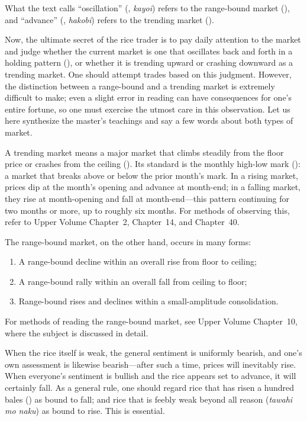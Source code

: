 \commentary
What the text calls ``oscillation'' (, \textit{kayoi}) refers
to the range-bound market (), and ``advance''
(, \textit{hakobi}) refers to the trending market
().

Now, the ultimate secret of the rice trader is to pay daily attention to
the market and judge whether the current market is one that oscillates
back and forth in a holding pattern (), or whether it
is trending upward or crashing downward as a trending market. One should
attempt trades based on this judgment. However, the distinction between a
range-bound and a trending market is extremely difficult to make; even a
slight error in reading can have consequences for one's entire fortune,
so one must exercise the utmost care in this observation. Let us here
synthesize the master's teachings and say a few words about both types of
market.

A trending market means a major market that climbs steadily from the
floor price or crashes from the ceiling (). Its
standard is the monthly high-low mark (): a market
that breaks above or below the prior month's mark. In a rising market,
prices dip at the month's opening and advance at month-end; in a falling
market, they rise at month-opening and fall at month-end---this pattern
continuing for two months or more, up to roughly six months. For methods
of observing this, refer to Upper Volume Chapter~2, Chapter~14, and
Chapter~40.

The range-bound market, on the other hand, occurs in many forms:

\begin{enumerate}
\item A range-bound decline within an overall rise from floor to ceiling;
\item A range-bound rally within an overall fall from ceiling to floor;
\item Range-bound rises and declines within a small-amplitude
  consolidation.
\end{enumerate}

For methods of reading the range-bound market, see Upper Volume
Chapter~10, where the subject is discussed in detail.


\begin{sokyubox}
{\small\itshape\color{sokyubar} }

\medskip
When the rice itself is weak, the general sentiment is uniformly
bearish, and one's own assessment is likewise bearish---after such a
time, prices will inevitably rise. When everyone's sentiment is bullish
and the rice appears set to advance, it will certainly fall. As a
general rule, one should regard rice that has risen a hundred bales
() as bound to fall; and rice that is feebly weak
beyond all reason (\textit{tawahi mo naku}) as bound to rise. This is
essential.
\end{sokyubox}

